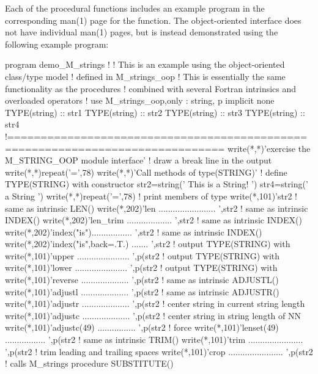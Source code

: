 Each of the procedural functions includes an example program in the corresponding man(1) page for the function. The object-\/oriented interface does not have individual man(1) pages, but is instead demonstrated using the following example program\+: \begin{DoxyVerb}program demo_M_strings
!
! This is an example using the object-oriented class/type model
! defined in M_strings_oop
! This is essentially the same functionality as the procedures
! combined with several Fortran intrinsics and overloaded operators
!
use M_strings_oop,only : string, p
implicit none
TYPE(string) :: str1
TYPE(string) :: str2
TYPE(string) :: str3
TYPE(string) :: str4
!==============================================================================
  write(*,*)'exercise the M_STRING_OOP module interface'
  ! draw a break line in the output
  write(*,*)repeat('=',78)
  write(*,*)'Call methods of type(STRING)'
  ! define TYPE(STRING) with constructor
  str2=string('   This  is  a  String!       ')
  str4=string(' a  String ')
  write(*,*)repeat('=',78)
  ! print members of type
  write(*,101)'str2%
  ! same as intrinsic LEN()
  write(*,202)'len ........................ ',str2%
  ! same as intrinsic INDEX()
  write(*,202)'len_trim ................... ',str2%
  ! same as intrinsic INDEX()
  write(*,202)'index("is")................. ',str2%
  ! same as intrinsic INDEX()
  write(*,202)'index("is",back=.T.) ....... ',str2%
  ! output TYPE(STRING) with %
  write(*,101)'upper ...................... ',p(str2%
  ! output TYPE(STRING) with %
  write(*,101)'lower ...................... ',p(str2%
  ! output TYPE(STRING) with %
  write(*,101)'reverse .................... ',p(str2%
  ! same as intrinsic ADJUSTL()
  write(*,101)'adjustl .................... ',p(str2%
  ! same as intrinsic ADJUSTR()
  write(*,101)'adjustr .................... ',p(str2%
  ! center string in current string length
  write(*,101)'adjustc .................... ',p(str2%
  ! center string in string length of NN
  write(*,101)'adjustc(49) ................ ',p(str2%
  ! force %
  write(*,101)'lenset(49) ................. ',p(str2%
  ! same as intrinsic TRIM()
  write(*,101)'trim ....................... ',p(str2%
  ! trim leading and trailing spaces
  write(*,101)'crop ....................... ',p(str2%
  ! calls M_strings procedure SUBSTITUTE()

\end{DoxyVerb}
